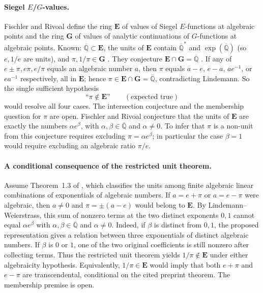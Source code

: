 \documentclass[11pt]{amsart}
\theoremstyle{definition}
\theoremstyle{remark}
\numberwithin{equation}{section}
\newcommand{\Q}{\mathbb{Q}}
\newcommand{\Qbar}{\overline{\mathbb{Q}}}
\begin{document}
\paragraph{Siegel \texorpdfstring{$E$}{E}/$G$-values.} Fischler and Rivoal \cite{FischlerRivoal2016} define the ring $\mathbf{E}$ of values of Siegel $E$-functions at algebraic points and the ring $\mathbf{G}$ of values of analytic continuations of $G$-functions at algebraic points. Known: $\overline{\Q}\subset\mathbf{E}$, the units of $\mathbf{E}$ contain $\overline{\Q}^*$ and $\exp(\overline{\Q})$ (so $e,1/e$ are units), and $\pi,1/\pi\in\mathbf{G}$ \cite{FischlerRivoal2014}. They conjecture $\mathbf{E}\cap\mathbf{G}=\overline{\Q}$ \cite{FischlerRivoal2024}. If any of $e\pm\pi,e\pi,e/\pi$ equals an algebraic number $a$, then $\pi$ equals $a-e$, $e-a$, $ae^{-1}$, or $ea^{-1}$ respectively, all in $\mathbf{E}$; hence $\pi\in\mathbf{E}\cap\mathbf{G}=\overline{\Q}$, contradicting Lindemann. So the single sufficient hypothesis
\[
\text{``$\pi\notin\mathbf{E}$''}\qquad(\text{expected true})
\]
would resolve all four cases.
The intersection conjecture and the membership question for $\pi$ are
open. Fischler and Rivoal \cite[Conjecture~1.2]{FischlerRivoal2026}
conjecture that the units of $\mathbf E$ are exactly the numbers
$\alpha e^\beta$, with $\alpha,\beta\in\Qbar$ and $\alpha\ne0$.
To infer that $\pi$ is a non-unit from this conjecture requires excluding
$\pi=\alpha e^\beta$; in particular the case $\beta=1$ would require
excluding an algebraic ratio $\pi/e$.

\paragraph{A conditional consequence of the restricted unit theorem.}
Assume Theorem~1.3 of \cite{FischlerRivoal2026}, which classifies the
units among finite algebraic linear combinations of exponentials of
algebraic numbers. If $a=e+\pi$ or $a=e-\pi$ were algebraic, then $a\ne0$
and $\pi=\pm(a-e)$ would belong to $\mathbf E$. By
Lindemann--Weierstrass, this sum of nonzero terms at the two distinct
exponents $0,1$ cannot equal $\alpha e^\beta$ with
$\alpha,\beta\in\Qbar$ and $\alpha\ne0$. Indeed, if $\beta$ is distinct
from $0,1$, the proposed representation gives a relation between three
exponentials of distinct algebraic numbers. If $\beta$ is $0$ or $1$,
one of the two original coefficients is still nonzero after collecting
terms. Thus the restricted unit theorem yields $1/\pi\notin\mathbf E$
under either algebraicity hypothesis. Equivalently, $1/\pi\in\mathbf E$
would imply that both $e+\pi$ and $e-\pi$ are transcendental, conditional
on the cited preprint theorem. The membership premise is open.
\end{document}
